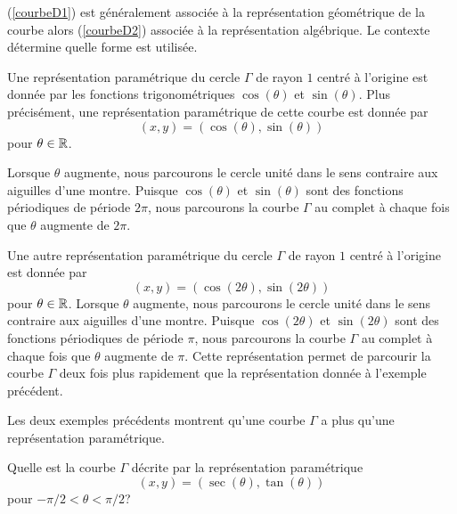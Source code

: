 {\begin{focus}{\dfn}
(\ref{courbeD1}) est généralement associée à la représentation
géométrique de la courbe alors (\ref{courbeD2}) associée à la
représentation algébrique.  Le contexte détermine quelle forme est
utilisée.
\end{focus}


\begin{egg}
Une représentation paramétrique du cercle $\Gamma$ de rayon $1$ centré
à l'origine est donnée par les fonctions trigonométriques
$\cos(\theta)$ et $\sin(\theta)$.  Plus précisément, une
représentation paramétrique de cette courbe est donnée par
\[
(x,y) = (\cos(\theta), \sin(\theta))
\]
pour $\theta \in \mathbb{R}$.


Lorsque $\theta$ augmente, nous parcourons le cercle unité dans le sens
contraire aux aiguilles d'une montre.  Puisque $\cos(\theta)$ et
$\sin(\theta)$ sont des fonctions périodiques de période $2\pi$, nous
parcourons la courbe $\Gamma$ au complet à chaque fois que $\theta$
augmente de $2\pi$.
\end{egg}

\begin{egg}
Une autre représentation paramétrique du cercle $\Gamma$ de rayon
$1$ centré à l'origine est donnée par
\[
(x,y) = (\cos(2\theta), \sin(2\theta))
\]
pour $\theta \in \mathbb{R}$.  Lorsque $\theta$ augmente, nous parcourons le
cercle unité dans le sens contraire aux aiguilles d'une
montre. Puisque $\cos(2\theta)$ et $\sin(2\theta)$ sont des fonctions
périodiques de période $\pi$, nous parcourons la courbe $\Gamma$ au
complet à chaque fois que $\theta$ augmente de $\pi$.  Cette
représentation permet de parcourir la courbe $\Gamma$ deux fois plus
rapidement que la représentation donnée à l'exemple précédent.
\end{egg}

Les deux exemples précédents montrent qu'une courbe $\Gamma$ a plus
qu'une représentation paramétrique.

\begin{egg}
Quelle est la courbe $\Gamma$ décrite par la représentation
paramétrique
\[
(x,y) = (\sec(\theta) , \tan(\theta))
\]
pour $-\pi/2 < \theta < \pi/2$?


\end{egg}}
